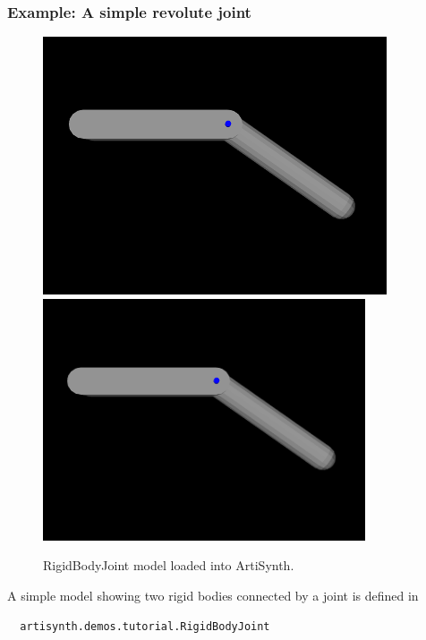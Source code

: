 \subsubsection{Example:  A simple revolute joint}
\label{RigidBodyJoint:sec}

\begin{figure}[ht]
\begin{center}
\iflatexml
 \includegraphics[]{images/RigidBodyJoint}
\else
 \includegraphics[width=3.75in]{images/RigidBodyJoint}
\fi
\end{center}
\caption{RigidBodyJoint model loaded into ArtiSynth.}
\label{RigidBodyJoint:fig}
\end{figure}

A simple model showing two rigid bodies connected by
a joint is defined in
%
\begin{verbatim}
  artisynth.demos.tutorial.RigidBodyJoint
\end{verbatim}
%

